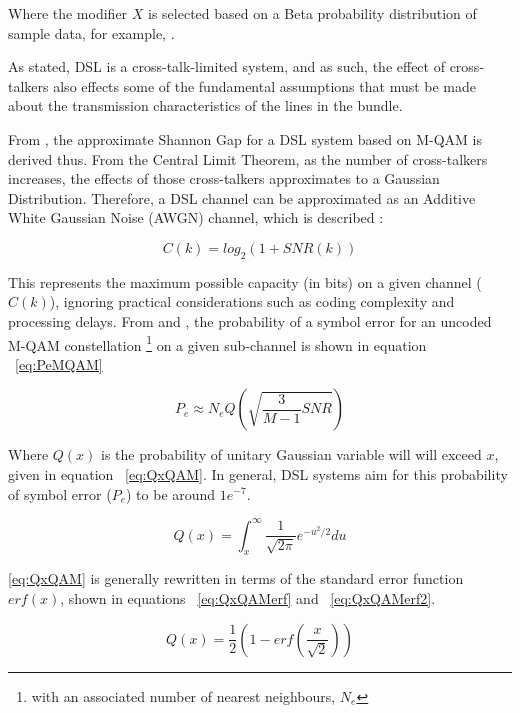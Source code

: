 Where the modifier \(X\) is selected based on a Beta probability distribution of sample data, for example, \cite{Alc07}.

As stated, DSL is a cross-talk-limited system, and as such, the effect of cross-talkers also effects some of the fundamental assumptions that must be made about the transmission characteristics of the lines in the bundle.

From \cite{SJ08}, the approximate Shannon Gap for a DSL system based on M-QAM is derived thus. From the Central Limit Theorem, as the number of cross-talkers increases, the effects of those cross-talkers approximates to a Gaussian Distribution\cite{KK93}. Therefore, a DSL channel can be approximated as an Additive White Gaussian Noise (AWGN) channel, which is described \cite{CS48}:

\begin{equation}\label{eq:AWGN}
C(k)=log_2(1+SNR(k))
\end{equation}

This represents the maximum possible capacity (in bits) on a given channel (\(C(k)\)), ignoring practical considerations such as coding complexity and processing delays. From \cite{CS48} and \cite{JMC91}, the probability of a symbol error for an uncoded M-QAM constellation \footnote{with an associated number of nearest neighbours, \(N_e\)} on a given sub-channel is shown in equation ~\eqref{eq:PeMQAM}

\begin{equation}\label{eq:PeMQAM}
P_e\approx N_eQ\left(\sqrt{\frac{3}{M-1}SNR}\right)
\end{equation}

Where \(Q(x)\) is the probability of unitary Gaussian variable will will exceed \(x\), given in equation ~\eqref{eq:QxQAM}. In general, DSL systems aim for this probability of symbol error (\(P_e\)) to be around \(1e^{-7}\).

\begin{equation}\label{eq:QxQAM}
Q(x)=\int_x^{\infty}\frac{1}{\sqrt{2\pi}}e^{-u^2/2} du
\end{equation}

\eqref{eq:QxQAM} is generally rewritten in terms of the standard error function \(erf(x)\), shown in equations ~\eqref{eq:QxQAMerf} and ~\eqref{eq:QxQAMerf2}.

\begin{equation}\label{eq:QxQAMerf}
Q(x)=\frac{1}{2}\left(1-erf(\frac{x}{\sqrt{2}})\right)
\end{equation}

